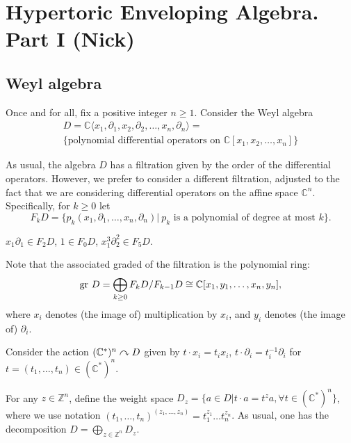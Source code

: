 


\newpage

\section{Hypertoric Enveloping Algebra. Part I (Nick)}

\subsection{Weyl algebra}

Once and for all, fix a positive integer $n\ge1$. Consider the Weyl algebra
\begin{equation}
\begin{array}{cc}
    D = \mathbb{C}\langle x_1,\partial_1, x_2, \partial_2, \dots, x_n, \partial_n \rangle = \\ \{\textrm{polynomial differential operators on  } \mathbb{C}[x_1,x_2, \dots, x_n]\}
\end{array}
\end{equation}

As usual, the algebra $D$ has a filtration given by the order of the differential operators. However, we prefer to consider a different filtration, adjusted to the fact that we are considering differential operators on the affine space $\mathbb{C}^n$. Specifically, for $k\ge0$ let
\begin{equation}
F_k D = \Big\{ p_{k}(x_1,\partial_1, \dots, x_n, \partial_n)\Big| ~ p_{k} \textrm{ is a polynomial of degree at most } k \Big\}.
\end{equation}
\begin{example} 
$x_1\partial_1\in F_2 D$, $1\in F_0D$, $x_1^3\partial_2^2\in F_5D$.
\end{example}
Note that the associated graded of the filtration is the polynomial ring:
\begin{equation}
\displaystyle {\rm gr ~} D = \bigoplus_{k\ge0} F_k D/{F_{k-1}D} \cong \mathbb{C} [x_1,y_1,\dots, x_n, y_n],
\end{equation}
where $x_i$ denotes (the image of) multiplication by $x_i$, and $y_i$ denotes (the image of) $\partial_i$.

Consider the action $(\mathbb{C}^*)^n \curvearrowright D$ given by $t\cdot x_i = t_ix_i$, $t\cdot \partial_i = t_i^{-1}\partial_i$ for $t=(t_1,\dots,t_n)\in (\mathbb{C}^*)^n$.

For any $z\in \mathbb{Z}^n$, define the weight space $D_z=\{a\in D | t\cdot a = t^z a, \forall t \in (\mathbb{C}^*)^n\}$, where we use notation $(t_1,\dots,t_n)^{(z_1,\dots, z_n)} = t_1^{z_1}\dots t_n^{z_n}$. As usual, one has the decomposition $D=\bigoplus_{z\in\mathbb{Z}^n}D_z$.

